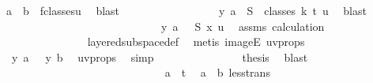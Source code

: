 \begin{isabellebody}
\ {\isacartoucheopen}a\ {\isacharless}{\kern0pt}\ b{\isacartoucheclose}\ {}\ f{\isacharunderscore}{\kern0pt}classes{\isacharunderscore}{\kern0pt}u\ \isamarkupfalse%
\ blast\isanewline
\ \ \ \ \ \ \ \ \ \ \ \ \ \ \isamarkupfalse%
\ \isamarkupfalse%
\ {\isachardoublequoteopen}y\ a\ {\isasymin}\ S\ {\isacharbackquote}{\kern0pt}\ classes\ k\ t\ u{\isachardoublequoteclose}\ \isamarkupfalse%
\ blast\isanewline
\ \ \ \ \ \ \ \ \ \ \ \ \isamarkupfalse%
\isanewline
\ \ \ \ \ \ \ \ \ \ \ \ \isamarkupfalse%
\ \isamarkupfalse%
\ {\isachardoublequoteopen}{\isasymchi}\ {\isacharparenleft}{\kern0pt}y\ a{\isacharparenright}{\kern0pt}\ {\isacharequal}{\kern0pt}\ {\isasymchi}\ {\isacharparenleft}{\kern0pt}S\ {\isacharparenleft}{\kern0pt}x\ u{\isacharparenright}{\kern0pt}{\isacharparenright}{\kern0pt}{\isachardoublequoteclose}\ \isamarkupfalse%
\ assms{\isacharparenleft}{\kern0pt}{}{\isacharparenright}{\kern0pt}\ calculation{\isacharparenleft}{\kern0pt}{}{\isacharcomma}{\kern0pt}\ {}{\isacharparenright}{\kern0pt}\ \isanewline
\ \ \ \ \ \ \ \ \ \ \ \ \ \ \isamarkupfalse%
\ layered{\isacharunderscore}{\kern0pt}subspace{\isacharunderscore}{\kern0pt}def\ \isamarkupfalse%
\ {\isacharparenleft}{\kern0pt}metis\ imageE\ uv{\isacharunderscore}{\kern0pt}props{\isacharparenright}{\kern0pt}\isanewline
\ \ \ \ \ \ \ \ \ \ \ \ \isamarkupfalse%
\ \isamarkupfalse%
\ {\isachardoublequoteopen}{\isasymchi}\ {\isacharparenleft}{\kern0pt}y\ a{\isacharparenright}{\kern0pt}\ {\isacharequal}{\kern0pt}\ {\isasymchi}\ {\isacharparenleft}{\kern0pt}y\ b{\isacharparenright}{\kern0pt}{\isachardoublequoteclose}\ \isamarkupfalse%
\ uv{\isacharunderscore}{\kern0pt}props\ \isamarkupfalse%
\ simp\isanewline
\ \ \ \ \ \ \ \ \ \ \ \ \isamarkupfalse%
\ \isamarkupfalse%
\ {\isacharquery}{\kern0pt}thesis\ \isamarkupfalse%
\ blast\isanewline
\ \ \ \ \ \ \ \ \ \ \isamarkupfalse%
\isanewline
\ \ \ \ \ \ \ \ \ \ \ \ \isamarkupfalse%
\ {}\isanewline
\ \ \ \ \ \ \ \ \ \ \ \ \isamarkupfalse%
\ \isamarkupfalse%
\ {\isachardoublequoteopen}a\ {\isacharless}{\kern0pt}\ t{\isachardoublequoteclose}\ \isamarkupfalse%
\ {\isacartoucheopen}a\ {\isacharless}{\kern0pt}\ b{\isacartoucheclose}\ less{\isacharunderscore}{\kern0pt}trans\ \isamarkupfalse%

\end{isabellebody}
